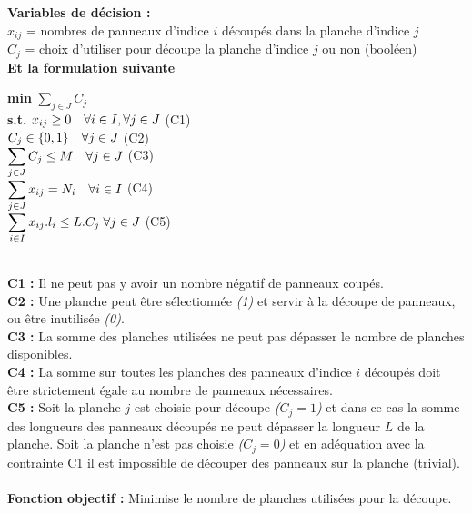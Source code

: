 \documentclass[12pt, openany]{report}
\begin{document}
\textbf{Variables de décision :}\\
$x_{ij}$ = nombres de panneaux d'indice $i$ découpés dans la planche d'indice $j$\\
$C_{j}$ = choix d'utiliser pour découpe la planche d'indice $j$ ou non (booléen)\\
\bigskip
\noindent 
\textbf{Et la formulation suivante}\\
 \begin{minipage}{0.8\textwidth}
 \begin{center}
    \textbf{min} \; $\displaystyle\sum_{j \in J} C_{j}$ \\
    \textbf{s.t.} \; $x_{ij} \geq 0 \quad \hfill \forall i \in I, \forall j \in J $ \hfill (C1) \\
     $ C_{j} \in \{0,1\} \quad \hfill \forall j \in J$  \hfill(C2) \\
     $\displaystyle\sum_{j \in J} C_{j} \leq M \quad \hfill \forall j \in J$  \hfill(C3) \\
     $\displaystyle\sum_{j \in J} x_{ij} = N_{i} \quad \hfill \forall i \in I$  \hfill(C4) \\
     $\displaystyle\sum_{i \in I} x_{ij} . l_{i} \leq L . C_{j} \; \hfill \forall j \in J$   \hfill(C5) \\
 \end{center}
 \end{minipage}
\newpage

\noindent 
\\ \textbf{C1 :} Il ne peut pas y avoir un nombre négatif de panneaux coupés. 
\\ \textbf{C2 :} Une planche peut être sélectionnée \textit{(1)} et servir à la découpe de panneaux, ou être inutilisée \textit{(0)}.
\\ \textbf{C3 :} La somme des planches utilisées ne peut pas dépasser le nombre de planches disponibles.
\\ \textbf{C4 :} La somme sur toutes les planches des panneaux d'indice $i$ découpés doit être strictement égale au nombre de panneaux nécessaires.
\\ \textbf{C5 :} Soit la planche $j$ est choisie pour découpe \textit{($C_{j}=1$)} et dans ce cas la somme des longueurs des panneaux découpés ne peut dépasser la longueur $L$ de la planche. Soit la planche n'est pas choisie \textit{($C_{j}=0$)} et en adéquation avec la contrainte C1 il est impossible de découper des panneaux sur la planche (trivial).
\\
\\ \textbf{Fonction objectif :} Minimise le nombre de planches utilisées pour la découpe.
\end{document}
